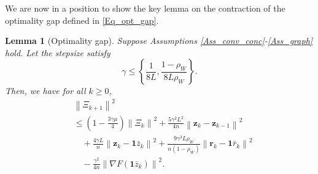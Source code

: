 \documentclass[letterpaper, 10 pt, conference]{ieeeconf}
\newtheorem{Lem}{Lemma}
\begin{document}
We are now in a position to show the key lemma on the contraction of the optimality gap defined in \eqref{Eq_opt_gap}.


\begin{Lem}[Optimality gap]\label{Lem_opt}
Suppose Assumptions \ref{Ass_conv_conc}-\ref{Ass_graph} hold. Let the stepsize satisfy 
\begin{equation}\label{Eq_stepsize_opt}
\gamma \leqslant \left\{ \frac{1}{8L}, \frac{1-\rho _W}{8L\rho _W} \right\}.
\end{equation}
Then, we have for all $k\geqslant0$,
\begin{equation}
\begin{aligned}
&\left\| \varXi _{k+1} \right\| ^2
\\
&\leqslant \left( 1-\frac{3\gamma \mu}{4} \right) \left\| \varXi _k \right\| ^2+\frac{5\gamma ^2L^2}{4n}\left\| \mathbf{z}_k-\mathbf{z}_{k-1} \right\| ^2
\\
&\quad +\frac{4\gamma L}{n}\left\| \mathbf{z}_k-\mathbf{1}\bar{z}_k \right\| ^2+\frac{9\gamma ^3L\rho _W}{n\left( 1-\rho _W \right)}\left\| \mathbf{r}_k-\mathbf{1}\bar{r}_k \right\| ^2
\\
&\quad -\frac{\gamma ^2}{4n}\left\| \nabla F\left( \mathbf{1}\bar{z}_k \right) \right\| ^2.
\end{aligned}
\end{equation}
\end{Lem}
\end{document}
